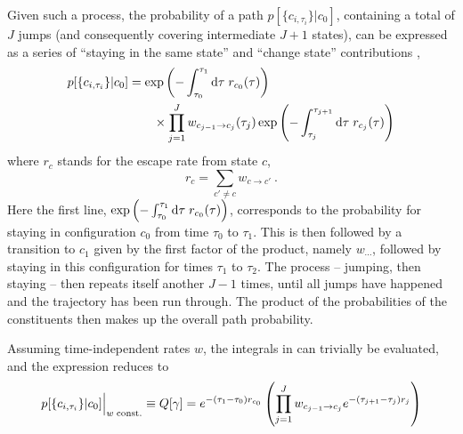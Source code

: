 Given such a process, the probability of a path \(p[\{c_{i,\tau_i}\}|c_0]\), containing a total of \(J\) jumps (and consequently covering intermediate \(J+1\) states), can be expressed as a series of ``staying in the same state'' and ``change state'' contributions \cite{seifert-review},
%
\begin{equation}
	\begin{split}
	\label{eqn:discrete path probability}
	p[\{c_{i,\tau_i}\} | c_0]
	& = \operatorname{exp}\left(-\int_{\tau_0}^{\tau_1}\mathrm{d}\tau\;r_{c_0}(\tau)\right)
	\\ &\qquad \times
	\prod_{j=1}^J
		w_{c_{j-1}\to c_j}(\tau_j)
		\operatorname{exp}\left(-\int_{\tau_j}^{\tau_{j+1}}\mathrm{d}\tau\;r_{c_j}(\tau)\right)
	\end{split}
\end{equation}
%
where \(r_c\) stands for the escape rate from state \(c\),
%
\begin{equation}
	r_c = \sum_{c'\neq c} w_{c\to c'} ~.
\end{equation}
%
Here the first line, \(\operatorname{exp}\left(-\int_{\tau_0}^{\tau_1}\mathrm{d}\tau\;r_{c_0}(\tau)\right)\), corresponds to the probability for staying in configuration \(c_0\) from time \(\tau_0\) to \(\tau_1\). This is then followed by a transition to \(c_1\) given by the first factor of the product, namely \(w_{\cdots}\), followed by staying in this configuration for times \(\tau_1\) to \(\tau_2\). The process -- jumping, then staying -- then repeats itself another \(J-1\) times, until all jumps have happened and the trajectory has been run through. The product of the probabilities of the constituents then makes up the overall path probability.

Assuming time-independent rates \(w\), the integrals in  can trivially be evaluated, and the expression reduces to
\begin{equation}
	p[\{c_{i,\tau_i}\} | c_0]\Bigr|_{w\;\mathrm{const.}}
	\equiv
	Q[\gamma]
	=
	e^{-(\tau_1-\tau_0)r_{c_0}} \left(
		\prod_{j = 1}^J
		w_{c_{j-1}\to c_j}
		e^{-(\tau_{j+1}-\tau_j)r_j}
		\right)
\end{equation}

